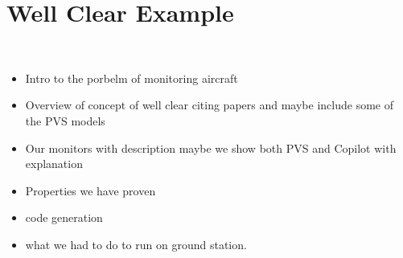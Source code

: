 \section{Well Clear Example}~\label{sec:WellClear}


\begin{itemize}
\item Intro to the porbelm of monitoring aircraft
\item Overview of concept of well clear citing papers and maybe include some of the PVS models
\item Our monitors with description maybe we show both PVS and Copilot with explanation
\item Properties we have proven
\item code generation 
\item what we had to do to run on ground station. 
\end{itemize}

